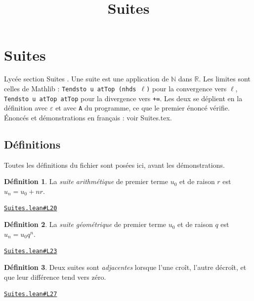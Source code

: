\documentclass[11pt,a4paper]{article}
\title{Suites}
\date{}
\theoremstyle{definition}
\newtheorem{definition}{Définition}
\theoremstyle{plain}
\newcommand{\source}[2]{\par\smallskip\noindent\hfill{\footnotesize\href{#1}{\texttt{#2}}}\par\smallskip}
\begin{document}
\maketitle
\sloppy

\section{Suites}

\noindent
Lycée \textemdash{} section \og{} Suites \fg{}.
Une suite est une application de \(\mathbb{N}\) dans \(\mathbb{R}\). Les limites sont celles de Mathlib :
\texttt{Tendsto u atTop (nhds \(\ell\))} pour la convergence vers \texttt{\(\ell\)}, \texttt{Tendsto u atTop atTop} pour la
divergence vers \texttt{+∞}. Les deux se déplient en la définition avec \texttt{\(\varepsilon\)} et avec \texttt{A} du
programme, ce que le premier énoncé vérifie.
Énoncés et démonstrations en français : voir Suites.tex.

\subsection{Définitions}

\noindent
Toutes les définitions du fichier sont posées ici, avant les démonstrations.

\begin{definition}
La \emph{suite arithmétique} de premier terme $u_0$ et de raison $r$ est
$u_n = u_0 + nr$.
\end{definition}
\source{https://github.com/Commutator-IO/learn-lean/blob/main/courses/02-lycee/03-suites/Suites.lean\#L20}{Suites.lean\#L20}

\begin{definition}
La \emph{suite géométrique} de premier terme $u_0$ et de raison $q$ est
$u_n = u_0 q^n$.
\end{definition}
\source{https://github.com/Commutator-IO/learn-lean/blob/main/courses/02-lycee/03-suites/Suites.lean\#L23}{Suites.lean\#L23}

\begin{definition}
Deux suites sont \emph{adjacentes} lorsque l'une croît, l'autre décroît, et que leur
différence tend vers zéro.
\end{definition}
\source{https://github.com/Commutator-IO/learn-lean/blob/main/courses/02-lycee/03-suites/Suites.lean\#L27}{Suites.lean\#L27}
\end{document}
